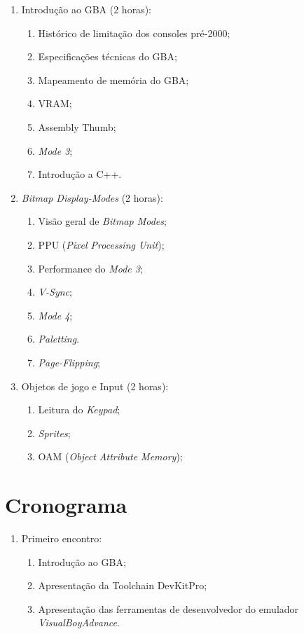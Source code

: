 \documentclass{article}
\begin{document}
\begin{enumerate}
    \item Introdução ao GBA (2 horas):
        \begin{enumerate}
            \item Histórico de limitação dos consoles pré-2000;
            \item Especificações técnicas do GBA\@;
            \item Mapeamento de memória do GBA\@;
            \item VRAM\@;
            \item Assembly Thumb;
            \item \textit{Mode 3};
            \item Introdução a C++.
        \end{enumerate}
    \item \textit{Bitmap Display-Modes} (2 horas):
        \begin{enumerate}
            \item Visão geral de \textit{Bitmap Modes};
            \item PPU (\textit{Pixel Processing Unit});
            \item Performance do \textit{Mode 3};
            \item \textit{V-Sync};
            \item \textit{Mode 4};
            \item \textit{Paletting}.
            \item \textit{Page-Flipping};
        \end{enumerate}
    \item Objetos de jogo e Input (2 horas):
        \begin{enumerate}
            \item Leitura do \textit{Keypad};
            \item \textit{Sprites};
            \item OAM (\textit{Object Attribute Memory});
        \end{enumerate}
\end{enumerate}

\section{Cronograma}

\begin{enumerate}[label= (\alph*)]
    \item Primeiro encontro:
        \begin{enumerate}
            \item Introdução ao GBA\@;
            \item Apresentação da Toolchain DevKitPro;
            \item Apresentação das ferramentas de desenvolvedor do emulador
                \textit{VisualBoyAdvance}.
        \end{enumerate}
\end{enumerate}

\nocite{*}


\end{document}
